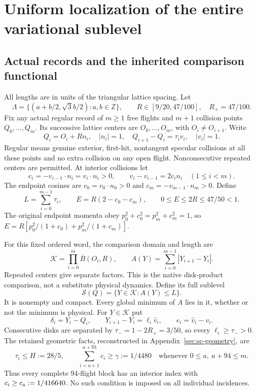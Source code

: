 \section{Uniform localization of the entire variational sublevel}
\label{sec:sc-sublevel}
\subsection{Actual records and the inherited comparison functional}
All lengths are in units of the triangular lattice spacing. Let
\[
 \Lambda=\{(a+b/2,\sqrt3b/2):a,b\in\mathbb Z\},\qquad
 R\in[9/20,47/100],\quad R_+=47/100.
\]
Fix any actual regular record of $m\ge1$ free flights and $m+1$ collision points $Q_0,\ldots,Q_m$. Its successive lattice centers are $O_0,\ldots,O_m$, with $O_i\ne O_{i+1}$. Write
\[
 Q_i=O_i+Rn_i,\quad |n_i|=1,\quad
 Q_{i+1}-Q_i=\tau_i v_i,\quad |v_i|=1.
\]
Regular means genuine exterior, first-hit, nontangent specular collisions at all these points and no extra collision on any open flight. Nonconsecutive repeated centers are permitted. At interior collisions let
\begin{equation}\label{eq:sc-reflection}
 c_i=-v_{i-1}\cdot n_i=v_i\cdot n_i>0,
 \qquad v_i-v_{i-1}=2c_i n_i\quad(1\le i<m).
\end{equation}
The endpoint cosines are $c_0=v_0\cdot n_0>0$ and $c_m=-v_{m-1}\cdot n_m>0$. Define
\begin{equation}\label{eq:sc-defect}
 L=\sum_{i=0}^{m-1}\tau_i,\qquad E=R(2-c_0-c_m),
 \qquad 0\le E\le2R\le47/50<1.
\end{equation}
The original endpoint momenta obey $p_0^2+c_0^2=p_m^2+c_m^2=1$, so $E=R[p_0^2/(1+c_0)+p_m^2/(1+c_m)]$.

For this fixed ordered word, the comparison domain and length are
\[
 \mathcal K=\prod_{i=0}^m\overline B(O_i,R),\qquad
 A(Y)=\sum_{i=0}^{m-1}|Y_{i+1}-Y_i|.
\]
Repeated centers give separate factors. This is the native disk-product comparison, not a substitute physical dynamics. Define its full sublevel
\[
 \mathcal S(Q)=\{Y\in\mathcal K:A(Y)\le L\}.
\]
It is nonempty and compact. Every global minimum of $A$ lies in it, whether or not the minimum is physical. For $Y\in\mathcal K$ put
\[
 \delta_i=Y_i-Q_i,\qquad
 Y_{i+1}-Y_i=\ell_i\widehat v_i,\qquad e_i=\widehat v_i-v_i.
\]
Consecutive disks are separated by $\tau_-=1-2R_+=3/50$, so every $\ell_i\ge\tau_->0$. The retained geometric facts, reconstructed in Appendix~\ref{sec:sc-geometry}, are
\begin{equation}\label{eq:sc-geometry-input}
 \tau_i\le H:=28/5,\qquad
 \sum_{i=a+1}^{a+93}c_i\ge\gamma:=1/4480
 \quad\text{whenever }0\le a,\ a+94\le m.
\end{equation}
Thus every complete 94-flight block has an interior index with
$c_i\ge c_{\rm a}:=1/416640$. No such condition is imposed on all individual incidences.

